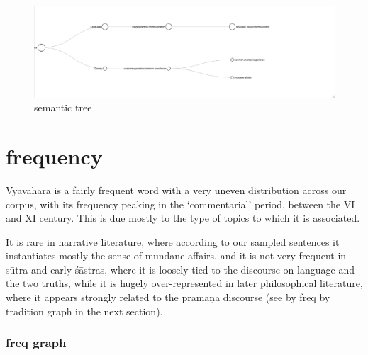 \documentclass[
  letterpaper,
  DIV=11,
  numbers=noendperiod,
  oneside]{scrreprt}
\begin{document}
\begin{figure}

{\centering \includegraphics{./www/SemanticTree_vyavahAra.webp}

}

\caption{\label{fig-semantictree}semantic tree}

\end{figure}

\hypertarget{frequency-1}{%
\section{frequency}\label{frequency-1}}

Vyavahāra is a fairly frequent word with a very uneven distribution
across our corpus, with its frequency peaking in the `commentarial'
period, between the VI and XI century. This is due mostly to the type of
topics to which it is associated.

It is rare in narrative literature, where according to our sampled
sentences it instantiates mostly the sense of mundane affairs, and it is
not very frequent in sūtra and early śāstras, where it is loosely tied
to the discourse on language and the two truths, while it is hugely
over-represented in later philosophical literature, where it appears
strongly related to the pramāṇa discourse (see by freq by tradition
graph in the next section).

\hypertarget{sec-freqcurve}{%
\subsubsection{freq graph}\label{sec-freqcurve}}

\end{document}
